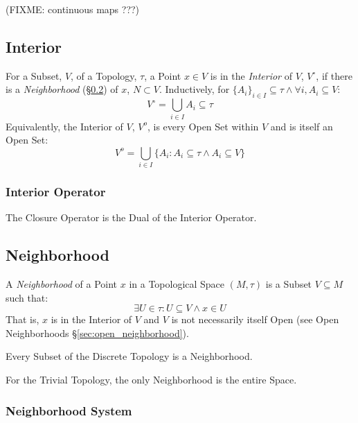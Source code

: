 (FIXME: continuous maps ???)



\subsection{Interior}\label{sec:interior}

For a Subset, $V$, of a Topology, $\tau$, a Point $x \in V$ is in the
\emph{Interior} of $V$, $V^{\circ}$, if there is a \emph{Neighborhood}
(\S\ref{sec:neighborhood}) of $x$, $N \subset V$. Inductively, for
$\{A_i\}_{i \in I} \subseteq \tau \wedge \forall i, A_i \subseteq V$:
\[
  V^{\circ} = \bigcup_{i \in I} A_i \subseteq \tau
\]
Equivalently, the Interior of $V$, $V^o$, is every Open Set within $V$
and is itself an Open Set:
\[
  V^o = \bigcup_{i \in I} \{ A_i : A_i \subseteq \tau \wedge A_i
  \subseteq V \}
\]



\subsubsection{Interior Operator}\label{sec:interior_operator}

The Closure Operator is the Dual of the Interior Operator.



\subsection{Neighborhood}\label{sec:neighborhood}

A \emph{Neighborhood} of a Point $x$ in a Topological Space $(M,\tau)$
is a Subset $V \subseteq M$ such that:
\[
  \exists U \in \tau : U \subseteq V \wedge x \in U
\]
That is, $x$ is in the Interior of $V$ and $V$ is not necessarily
itself Open (see Open Neighborhoods \S\ref{sec:open_neighborhood}).

Every Subset of the Discrete Topology is a Neighborhood.

For the Trivial Topology, the only Neighborhood is the entire Space.



\subsubsection{Neighborhood System}\label{sec:neighborhood_system}

